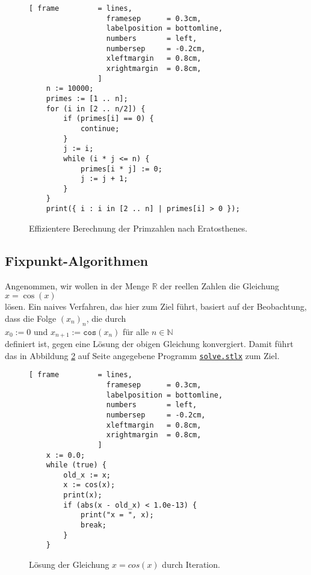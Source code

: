 \begin{figure}[!ht]
  \centering
\begin{Verbatim}[ frame         = lines, 
                  framesep      = 0.3cm, 
                  labelposition = bottomline,
                  numbers       = left,
                  numbersep     = -0.2cm,
                  xleftmargin   = 0.8cm,
                  xrightmargin  = 0.8cm,
                ]
    n := 10000;
    primes := [1 .. n];
    for (i in [2 .. n/2]) {
        if (primes[i] == 0) {
            continue;
        }
        j := i;
        while (i * j <= n) {
            primes[i * j] := 0;
            j := j + 1;
        }
    }
    print({ i : i in [2 .. n] | primes[i] > 0 });
\end{Verbatim} 
\vspace*{-0.3cm}
\caption{Effizientere Berechnung der Primzahlen nach Eratosthenes.}  \label{fig:primes-eratosthenes.stlx}
\end{figure} %


\subsection{Fixpunkt-Algorithmen}
Angenommen, wir wollen in der Menge $\mathbb{R}$ der reellen Zahlen die
Gleichung \\[0.2cm]
\hspace*{1.3cm} $x = \cos(x)$ \\[0.2cm]
lösen.  Ein naives Verfahren, das hier zum Ziel führt, basiert auf der
Beobachtung, dass die Folge $(x_n)_n$, die durch \\[0.2cm]
\hspace*{1.3cm} $x_0 := 0$ und $x_{n+1} := \mathtt{cos}(x_n)$ für alle $n \in \mathbb{N}$ \\[0.2cm]
definiert ist, gegen eine Lösung der obigen Gleichung konvergiert.  Damit führt das in
Abbildung \ref{fig:solve.stlx} auf Seite \pageref{fig:solve.stlx} angegebene Programm
\href{https://github.com/karlstroetmann/Logik/blob/master/SetlX/solve.stlx}{\texttt{solve.stlx}}
zum Ziel.

\begin{figure}[!ht]
  \centering
\begin{Verbatim}[ frame         = lines, 
                  framesep      = 0.3cm, 
                  labelposition = bottomline,
                  numbers       = left,
                  numbersep     = -0.2cm,
                  xleftmargin   = 0.8cm,
                  xrightmargin  = 0.8cm,
                ]
    x := 0.0;
    while (true) {
        old_x := x;
        x := cos(x);    
        print(x);
        if (abs(x - old_x) < 1.0e-13) {
            print("x = ", x);
            break;
        }   
    }
\end{Verbatim} 
\vspace*{-0.3cm}
\caption{Lösung der Gleichung $x = cos(x)$ durch Iteration.}  \label{fig:solve.stlx}
\end{figure} %

